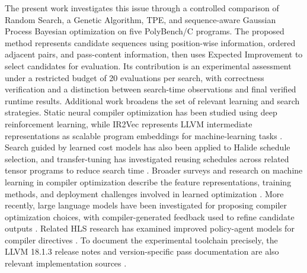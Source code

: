 The present work investigates this issue through a controlled comparison of Random Search, a Genetic Algorithm, TPE, and sequence-aware Gaussian Process Bayesian optimization on five PolyBench/C programs. The proposed method represents candidate sequences using position-wise information, ordered adjacent pairs, and pass-content information, then uses Expected Improvement to select candidates for evaluation. Its contribution is an experimental assessment under a restricted budget of 20 evaluations per search, with correctness verification and a distinction between search-time observations and final verified runtime results. Additional work broadens the set of relevant learning and search strategies. Static neural compiler optimization has been studied using deep reinforcement learning, while IR2Vec represents LLVM intermediate representations as scalable program embeddings for machine-learning tasks \cite{mammadli2020static,venkatakeerthy2020ir2vec}. Search guided by learned cost models has also been applied to Halide schedule selection, and transfer-tuning has investigated reusing schedules across related tensor programs to reduce search time \cite{gibson2022transfer,adams2019halide}. Broader surveys and research on machine learning in compiler optimization describe the feature representations, training methods, and deployment challenges involved in learned optimization \cite{wang2018mlcompiler,hajali2021thesis}. More recently, large language models have been investigated for proposing compiler optimization choices, with compiler-generated feedback used to refine candidate outputs \cite{cummins2023llmcompiler,grubisic2024feedback}. Related HLS research has examined improved policy-agent models for compiler directives \cite{munafo2023policy}. To document the experimental toolchain precisely, the LLVM 18.1.3 release notes and version-specific pass documentation are also relevant implementation sources \cite{llvm1813notes,llvm1813passes}.
